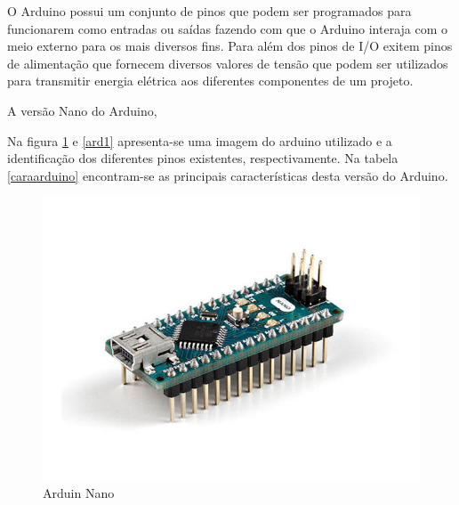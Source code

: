 O Arduino possui um conjunto de pinos que podem ser programados para funcionarem como entradas ou saídas fazendo com que o Arduino interaja com o meio externo para os mais diversos fins. Para além dos pinos de I/O exitem pinos de alimentação que fornecem diversos valores de tensão que podem ser utilizados para transmitir energia elétrica aos diferentes componentes de um projeto. 

A versão Nano do Arduino, 

Na figura \ref{ard2} e \ref{ard1} apresenta-se uma imagem do arduino utilizado e a identificação dos diferentes pinos existentes, respectivamente. Na tabela \ref{caraarduino} encontram-se as principais características desta versão do Arduino. 


\begin{figure}[h]
	\centering
	\begin{minipage}[b]{0.5\textwidth}
		\includegraphics[width=\textwidth]{img/hardware/nano-img.jpg}
		\caption{Arduin Nano}
		\label{ard2}
	\end{minipage}
	\hfill
	\begin{minipage}[b]{0.3\textwidth}

\end{minipage}
\end{figure}
